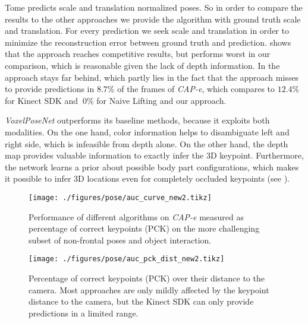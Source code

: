 Tome \etal\cite{tome_lifting_2017} predicts scale and translation normalized poses. So in order to compare the results to the other approaches we provide the algorithm with ground truth scale and translation. For every prediction we seek scale and translation in order to minimize the reconstruction error between ground truth and prediction.  shows that the approach reaches competitive results, but performs worst in our comparison, which is reasonable given the lack of depth information. In  the approach stays far behind, which partly lies in the fact that the approach misses to provide predictions in $8.7 \%$ of the frames of \textit{CAP-e}, which compares to $12.4 \%$ for Kinect SDK and $~0 \%$ for Naive Lifting and our approach.

\textit{VoxelPoseNet} outperforms its baseline methods, because it exploits both modalities. On the one hand, color information helps to disambiguate left and right side, which is infeasible from depth alone. On the other hand, the depth map provides valuable information to exactly infer the 3D keypoint. Furthermore, the network learns a prior about possible body part configurations, which makes it possible to infer 3D locations even for completely occluded keypoints (see ).

\begin{figure}
    \centering  
        \texttt{[image: ./figures/pose/auc\_curve\_new2.tikz]}
\caption{Performance of different algorithms on \textit{CAP-e} measured as percentage of correct keypoints (PCK) on the more challenging subset of non-frontal poses and object interaction.}\label{fig:auc_curves_cap}
\end{figure}

\begin{figure}
    \centering  
        \texttt{[image: ./figures/pose/auc\_pck\_dist\_new2.tikz]}
\caption{Percentage of correct keypoints (PCK) over their distance to the camera. Most approaches are only mildly affected by the keypoint distance to the camera, but the Kinect SDK can only provide predictions in a limited range.}\label{fig:pck_over_dist}
\end{figure}


